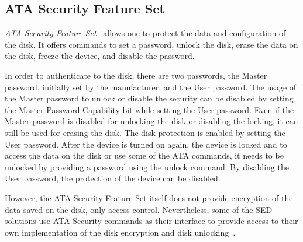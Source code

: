 





\subsection{ATA Security Feature Set}
\label{subsection:enc_ata}

\emph{ATA Security Feature Set}~\cite{acs-3} allows one to protect the data and configuration of the disk.
It offers commands to set a password, unlock the disk, erase the data on the disk, freeze the device, and disable the password.

In order to authenticate to the disk, there are two passwords, the Master password, initially set by the manufacturer, and the User password.
The usage of the Master password to unlock or disable the security can be disabled by setting the Master Password Capability bit while setting the User password. Even if the Master password is disabled for unlocking the disk or disabling the locking, it can still be used for erasing the disk.
The disk protection is enabled by setting the User password. After the device is turned on again, the device is locked and to access the data on the disk or use some of the ATA commands, it needs to be unlocked by providing a password using the unlock command. By disabling the User password, the protection of the device can be disabled.

However, the ATA Security Feature Set itself does not provide encryption of the data saved on the disk, only access control.
Nevertheless, some of the SED solutions use ATA Security commands as their interface to provide access to their own implementation of the disk encryption and disk unlocking~\cite{self_encrypting_deception}.

